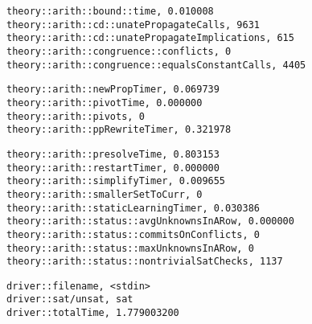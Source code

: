 \begin{lstlisting}
theory::arith::bound::time, 0.010008
theory::arith::cd::unatePropagateCalls, 9631
theory::arith::cd::unatePropagateImplications, 615
theory::arith::congruence::conflicts, 0
theory::arith::congruence::equalsConstantCalls, 4405
\end{lstlisting}
 \begin{quote}
   	\center[\ldots]
 \end{quote}
\begin{lstlisting}
theory::arith::newPropTimer, 0.069739
theory::arith::pivotTime, 0.000000
theory::arith::pivots, 0
theory::arith::ppRewriteTimer, 0.321978
\end{lstlisting}
 \begin{quote}
   	\center[\ldots]
 \end{quote}
\begin{lstlisting}
theory::arith::presolveTime, 0.803153
theory::arith::restartTimer, 0.000000
theory::arith::simplifyTimer, 0.009655
theory::arith::smallerSetToCurr, 0
theory::arith::staticLearningTimer, 0.030386
theory::arith::status::avgUnknownsInARow, 0.000000
theory::arith::status::commitsOnConflicts, 0
theory::arith::status::maxUnknownsInARow, 0
theory::arith::status::nontrivialSatChecks, 1137
\end{lstlisting}
 \begin{quote}
   	\center[\ldots]
 \end{quote}
\begin{lstlisting}
driver::filename, <stdin>
driver::sat/unsat, sat
driver::totalTime, 1.779003200
\end{lstlisting}